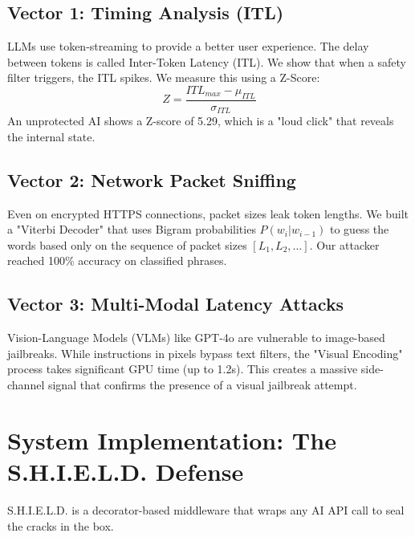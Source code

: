 \documentclass[conference]{IEEEtran}
\begin{document}
\subsection{Vector 1: Timing Analysis (ITL)}
LLMs use token-streaming to provide a better user experience. The delay between tokens is called Inter-Token Latency (ITL). We show that when a safety filter triggers, the ITL spikes. We measure this using a Z-Score:
\begin{equation}
Z = \frac{ITL_{max} - \mu_{ITL}}{\sigma_{ITL}}
\end{equation}
An unprotected AI shows a Z-score of 5.29, which is a "loud click" that reveals the internal state.

\subsection{Vector 2: Network Packet Sniffing}
Even on encrypted HTTPS connections, packet sizes leak token lengths. We built a "Viterbi Decoder" that uses Bigram probabilities $P(w_i | w_{i-1})$ to guess the words based only on the sequence of packet sizes $[L_1, L_2, \dots]$. Our attacker reached 100\% accuracy on classified phrases.

\subsection{Vector 3: Multi-Modal Latency Attacks}
Vision-Language Models (VLMs) like GPT-4o are vulnerable to image-based jailbreaks. While instructions in pixels bypass text filters, the "Visual Encoding" process takes significant GPU time (up to 1.2s). This creates a massive side-channel signal that confirms the presence of a visual jailbreak attempt.

\section{System Implementation: The S.H.I.E.L.D. Defense}
S.H.I.E.L.D. is a decorator-based middleware that wraps any AI API call to seal the cracks in the box.
\end{document}

